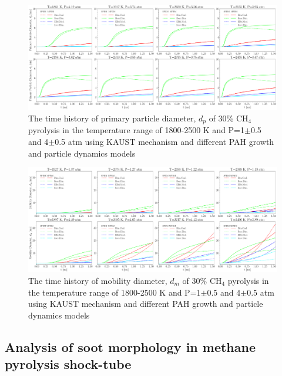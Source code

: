 \begin{figure}[H]
	\centering
	\includegraphics[width=1\textwidth]{Figures/Results/Shocktube/Stanford/june/stsh_cases_dp.pdf}
	\caption{The time history of primary particle diameter, $d_p$ of 30\% $\mathrm{CH_4}$ pyrolysis in the temperature range of 1800-2500 K and P=1$\pm$0.5 and 4$\pm$0.5 atm using KAUST mechanism and different PAH growth and particle dynamics models}
	\label{fig:shocktubest_sepcasedp} 
\end{figure}

\begin{figure}[H]
	\centering
	\includegraphics[width=1\textwidth]{Figures/Results/Shocktube/Stanford/September/stsh_cases_dm.pdf}
	\caption{The time history of mobility diameter, $d_m$ of 30\% $\mathrm{CH_4}$ pyrolysis in the temperature range of 1800-2500 K and P=1$\pm$0.5 and 4$\pm$0.5 atm using KAUST mechanism and different PAH growth and particle dynamics models}
	\label{fig:shocktubest_sepcasedm} 
\end{figure}

\subsection{Analysis of soot morphology in methane pyrolysis shock-tube}

